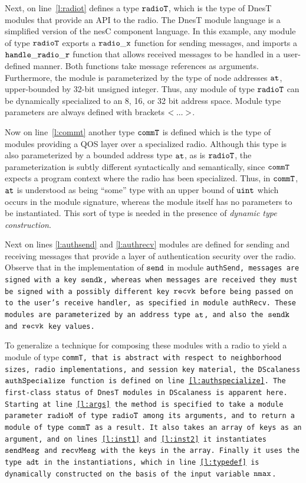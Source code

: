 Next, on line~\ref{l:radiot} defines a type $\tt{radioT}$, which is the type of DnesT modules
that provide an API to the radio. The DnesT module language is a simplified version of the nesC
component language. In this example, any module of type $\tt{radioT}$ exports a $\tt{radio\_x}$
function for sending messages, and imports a $\tt{handle\_radio\_r}$ function that allows
received messages to be handled in a user-defined manner. Both functions take message references
as arguments. Furthermore, the module is parameterized by the type of node addresses $\tt{at}$,
upper-bounded by 32-bit unsigned integer. Thus, any module of type $\tt{radioT}$ can be
dynamically specialized to an 8, 16, or 32 bit address space. Module type parameters are always
defined with brackets $\tt{<...>}$.
 
Now on line~\ref{l:commt} another type $\tt{commT}$ is defined which is the type of modules
providing a QOS layer over a specialized radio. Although this type is also parameterized by a
bounded address type $\tt{at}$, as is $\tt{radioT}$, the parameterization is subtly different
syntactically and semantically, since $\tt{commT}$ expects a program context where the radio has
been specialized. Thus, in $\tt{commT}$, $\tt{at}$ is understood as being ``some'' type with an
upper bound of $\tt{uint}$ which occurs in the module signature, whereas the module itself has
no parameters to be instantiated. This sort of type is needed in the presence of \emph{dynamic
  type construction}.

Next on lines \ref{l:authsend} and \ref{l:authrecv} modules are defined for sending and
receiving messages that provide a layer of authentication security over the radio. Observe that
in the implementation of $\tt{send}$ in module \tt{authSend}, messages are signed with a key
$\tt{sendk}$, whereas when messages are received they must be signed with a possibly different
key $\tt{recvk}$ before being passed on to the user's receive handler, as specified in module
\tt{authRecv}. These modules are parameterized by an address type $\tt{at}$, and also the
$\tt{sendk}$ and $\tt{recvk}$ key values.

To generalize a technique for composing these modules with a radio to yield a module of type
\tt{commT}, that is abstract with respect to neighborhood sizes, radio implementations, and
session key material, the DScalaness $\tt{authSpecialize}$ function is defined on
line~\ref{l:authspecialize}. The first-class status of DnesT modules in DScalaness is apparent
here. Starting at line~\ref{l:args} the method is specified to take a module parameter
$\tt{radioM}$ of type $\tt{radioT}$ among its arguments, and to return a module of type
$\tt{commT}$ as a result. It also takes an array of keys as an argument, and on
lines~\ref{l:inst1} and~\ref{l:inst2} it instantiates $\tt{sendMesg}$ and $\tt{recvMesg}$ with
the keys in the array. Finally it uses the type $\tt{adt}$ in the instantiations, which in
line~\ref{l:typedef} is dynamically constructed on the basis of the input variable $\tt{nmax}$.

